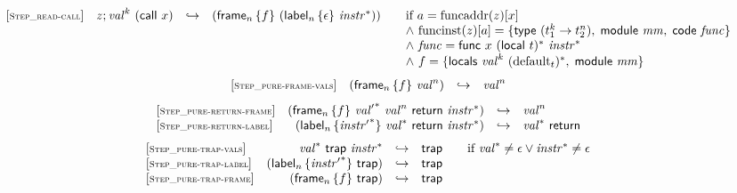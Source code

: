 \documentclass{article}
\begin{document}
$$
\begin{array}{@{}l@{}rcl@{}l@{}}
{[\textsc{\scriptsize Step\_read{-}call}]} \quad & z ; {{\mathit{val}}^{k}}~(\mathsf{call}~x) &\hookrightarrow& ({\mathsf{frame}}_{n}\,\{ f \}~({\mathsf{label}}_{n}\,\{ \epsilon \}~{{\mathit{instr}}^\ast}))
  &\qquad \mbox{if}~a = {\mathrm{funcaddr}}(z){}[x] \\
  &&&&\qquad {\land}~{\mathrm{funcinst}}(z){}[a] = \{ \begin{array}[t]{@{}l@{}}
\mathsf{type}~({t_1^{k}} \rightarrow {t_2^{n}}),\; \mathsf{module}~{\mathit{mm}},\; \mathsf{code}~{\mathit{func}} \}\end{array} \\
  &&&&\qquad {\land}~{\mathit{func}} = \mathsf{func}~x~{(\mathsf{local}~t)^\ast}~{{\mathit{instr}}^\ast} \\
  &&&&\qquad {\land}~f = \{ \begin{array}[t]{@{}l@{}}
\mathsf{locals}~{{\mathit{val}}^{k}}~{({{\mathrm{default}}}_{t})^\ast},\; \mathsf{module}~{\mathit{mm}} \}\end{array} \\
\end{array}
$$
$$
\begin{array}{@{}l@{}rcl@{}l@{}}
{[\textsc{\scriptsize Step\_pure{-}frame{-}vals}]} \quad & ({\mathsf{frame}}_{n}\,\{ f \}~{{\mathit{val}}^{n}}) &\hookrightarrow& {{\mathit{val}}^{n}} \\
\end{array}
$$
$$
\begin{array}{@{}l@{}rcl@{}l@{}}
{[\textsc{\scriptsize Step\_pure{-}return{-}frame}]} \quad & ({\mathsf{frame}}_{n}\,\{ f \}~{{\mathit{val}'}^\ast}~{{\mathit{val}}^{n}}~\mathsf{return}~{{\mathit{instr}}^\ast}) &\hookrightarrow& {{\mathit{val}}^{n}} \\
{[\textsc{\scriptsize Step\_pure{-}return{-}label}]} \quad & ({\mathsf{label}}_{n}\,\{ {{\mathit{instr}'}^\ast} \}~{{\mathit{val}}^\ast}~\mathsf{return}~{{\mathit{instr}}^\ast}) &\hookrightarrow& {{\mathit{val}}^\ast}~\mathsf{return} \\
\end{array}
$$
$$
\begin{array}{@{}l@{}rcl@{}l@{}}
{[\textsc{\scriptsize Step\_pure{-}trap{-}vals}]} \quad & {{\mathit{val}}^\ast}~\mathsf{trap}~{{\mathit{instr}}^\ast} &\hookrightarrow& \mathsf{trap}
  &\qquad \mbox{if}~{{\mathit{val}}^\ast} \neq \epsilon \lor {{\mathit{instr}}^\ast} \neq \epsilon \\
{[\textsc{\scriptsize Step\_pure{-}trap{-}label}]} \quad & ({\mathsf{label}}_{n}\,\{ {{\mathit{instr}'}^\ast} \}~\mathsf{trap}) &\hookrightarrow& \mathsf{trap} \\
{[\textsc{\scriptsize Step\_pure{-}trap{-}frame}]} \quad & ({\mathsf{frame}}_{n}\,\{ f \}~\mathsf{trap}) &\hookrightarrow& \mathsf{trap} \\
\end{array}
$$
\end{document}
